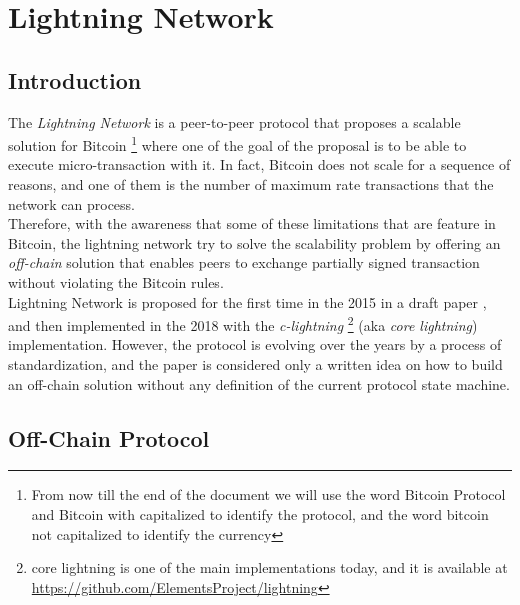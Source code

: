 \setcounter{page}{1}

\chapter{Lightning Network}

\newcommand{\noteOnBitcoinNaming}[0]{
    \footnote{
        From now till the end of the document we will use the word Bitcoin Protocol and
        Bitcoin with capitalized to identify the protocol, and the word bitcoin not capitalized to identify the currency
    }
}

\newcommand{\noteOnCLNImpl}[0]{
    \footnote{
    core lightning is one of the main implementations today, and it is available at
    \href{https://github.com/ElementsProject/lightning}{https://github.com/ElementsProject/lightning}
    }
}



\section{Introduction}

The \emph{Lightning Network} is a peer-to-peer protocol that proposes a scalable solution for Bitcoin\noteOnBitcoinNaming where one
of the goal of the proposal is to be able to execute micro-transaction with it.
In fact, Bitcoin does not scale for a sequence of reasons, and one of them is the number of
maximum rate transactions that the network can process.\\
Therefore, with the awareness that some of these limitations that are feature in Bitcoin, the lightning network try to solve
the scalability problem by offering an \emph{off-chain} solution that enables peers to exchange partially
signed transaction without violating the Bitcoin rules.\\
Lightning Network is proposed for the first time in the 2015 in a draft paper \cite{lightning-network-paper},
and then implemented in the 2018 with the \emph{c-lightning}\noteOnCLNImpl (aka \emph{core lightning}) implementation.
However, the protocol is evolving over the years by a process of standardization\cite{lightning-bolts}, and the paper is considered
only a written idea on how to build an off-chain solution without any definition of the current protocol state machine.

\section{Off-Chain Protocol}

